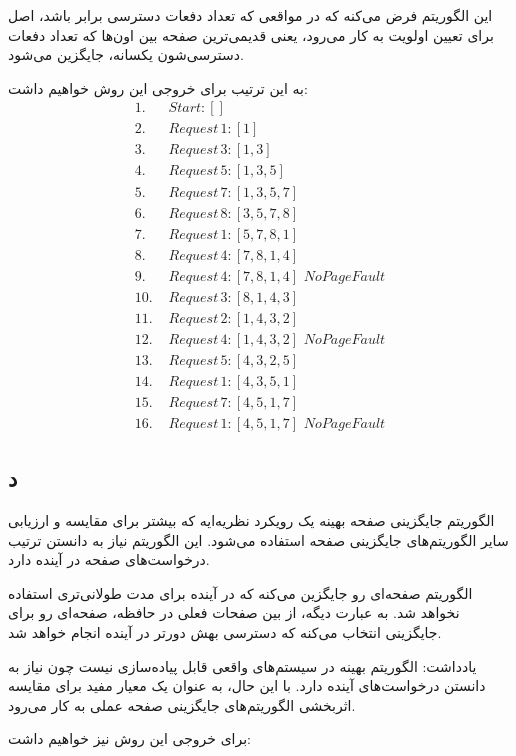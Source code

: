 این الگوریتم فرض می‌کنه که در مواقعی که تعداد دفعات دسترسی برابر باشد، اصل  برای تعیین اولویت به کار می‌رود، یعنی قدیمی‌ترین صفحه بین اون‌ها که تعداد دفعات دسترسی‌شون یکسانه، جایگزین می‌شود.

به این ترتیب برای خروجی این روش خواهیم داشت:
\begin{align*}
1.\,\,  &Start: [] \\
2.\,\,  &Request\, 1: [1] \\
3.\,\,  &Request\, 3: [1, 3] \\
4.\,\,  &Request\, 5: [1, 3, 5] \\
5.\,\,  &Request\, 7: [1, 3, 5, 7] \\
6.\,\,  &Request\, 8: [3, 5, 7, 8] \\
7.\,\,  &Request\, 1: [5, 7, 8, 1] \\
8.\,\,  &Request\, 4: [7, 8, 1, 4] \\
9.\,\,  &Request\, 4: [7, 8, 1, 4] \,\, No Page Fault \\
10.\,\, &Request\, 3: [8, 1, 4, 3] \\
11.\,\, &Request\, 2: [1, 4, 3, 2] \\
12.\,\, &Request\, 4: [1, 4, 3, 2] \,\, No Page Fault \\
13.\,\, &Request\, 5: [4, 3, 2, 5] \\
14.\,\, &Request\, 1: [4, 3, 5, 1] \\
15.\,\, &Request\, 7: [4, 5, 1, 7] \\
16.\,\, &Request\, 1: [4, 5, 1, 7] \,\, No Page Fault
\end{align*}

\subsection*{د}
الگوریتم جایگزینی صفحه بهینه یک رویکرد نظریه‌ایه که بیشتر برای مقایسه و ارزیابی سایر الگوریتم‌های جایگزینی صفحه استفاده می‌شود. این الگوریتم نیاز به دانستن ترتیب درخواست‌های صفحه در آینده دارد.

الگوریتم صفحه‌ای رو جایگزین می‌کنه که در آینده برای مدت طولانی‌تری استفاده نخواهد شد. به عبارت دیگه، از بین صفحات فعلی در حافظه، صفحه‌ای رو برای جایگزینی انتخاب می‌کنه که دسترسی بهش دورتر در آینده انجام خواهد شد.

یادداشت:
الگوریتم بهینه در سیستم‌های واقعی قابل پیاده‌سازی نیست چون نیاز به دانستن درخواست‌های آینده دارد. با این حال، به عنوان یک معیار مفید برای مقایسه اثربخشی الگوریتم‌های جایگزینی صفحه عملی به کار می‌رود.

برای خروجی این روش نیز خواهیم داشت:

